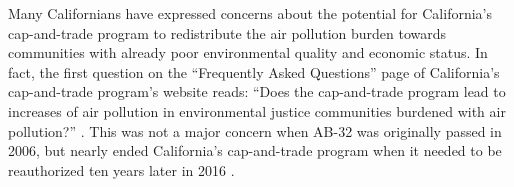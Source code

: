 Many Californians have expressed concerns about the potential for California's cap-and-trade program to redistribute the air pollution burden towards communities with already poor environmental quality and economic status. In fact, the first question on the ``Frequently Asked Questions'' page of California's cap-and-trade program's website reads: ``Does the cap-and-trade program lead to increases of air pollution in environmental justice communities burdened with air pollution?'' \citep{carb_FAQ}. This was not a major concern when AB-32 was originally passed in 2006, but nearly ended California's cap-and-trade program when it needed to be reauthorized ten years later in 2016 \citep{johnson2020cap}. 







